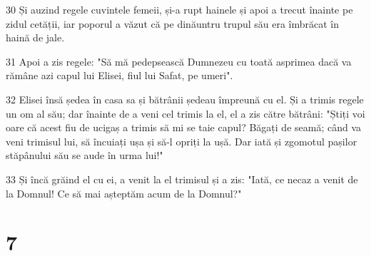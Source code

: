 \par 30 Și auzind regele cuvintele femeii, și-a rupt hainele și apoi a trecut înainte pe zidul cetății, iar poporul a văzut că pe dinăuntru trupul său era îmbrăcat în haină de jale.
\par 31 Apoi a zis regele: "Să mă pedepsească Dumnezeu cu toată asprimea dacă va rămâne azi capul lui Elisei, fiul lui Safat, pe umeri".
\par 32 Elisei însă ședea în casa sa și bătrânii ședeau împreună cu el. Și a trimis regele un om al său; dar înainte de a veni cel trimis la el, el a zis către bătrâni: "Știți voi oare că acest fiu de ucigaș a trimis să mi se taie capul? Băgați de seamă; când va veni trimisul lui, să încuiați ușa și să-l opriți la ușă. Dar iată și zgomotul pașilor stăpânului său se aude în urma lui!"
\par 33 Și încă grăind el cu ei, a venit la el trimisul și a zis: "Iată, ce necaz a venit de la Domnul! Ce să mai așteptăm acum de la Domnul?"

\chapter{7}

